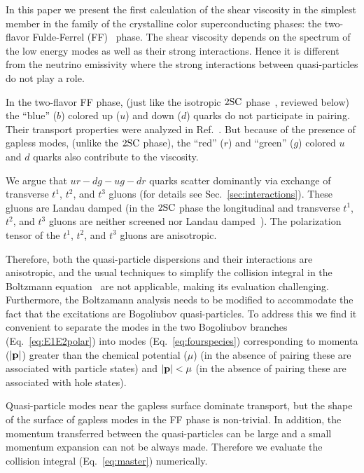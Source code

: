\documentclass[10pt, aps, prd, superscriptaddress, nofootinbib, 
               amsmath, amssymb, twocolumn,
               preprintnumbers, showpacs,
               raggedbottom,
               floatfix]{revtex4-1}
\newcommand{\bfp}{{\bf{p}}}
\newcommand{\SC}{{\rm{SC}}}
\begin{document}
In this paper we present the first calculation of the shear viscosity in the
simplest member in the family of the crystalline color superconducting phases:
the two-flavor Fulde-Ferrel (FF)~\cite{fulde1964superconductivity} phase. The
shear viscosity depends on the spectrum of the low energy modes as well
as their strong interactions. Hence it is different from the neutrino
emissivity where the strong interactions between quasi-particles do not play 
a role.  

In the two-flavor FF phase, (just like the isotropic $2\SC$
phase~\cite{Alford:1997zt,Rapp:1997zu}, reviewed
below) the ``blue'' ($b$) colored up ($u$) and down ($d$) quarks do not
participate in pairing. Their transport properties were analyzed in
Ref.~\cite{Alford:2014doa}. But because of the presence of gapless modes,
(unlike the $2\SC$ phase), the ``red'' ($r$) and ``green'' ($g$) colored $u$
and $d$ quarks also contribute to the viscosity.

We argue that $ur-dg-ug-dr$ quarks scatter dominantly via exchange of
transverse $t^1$, $t^2$, and $t^3$ gluons (for details see
Sec.~\ref{sec:interactions}). These gluons are Landau damped (in the $2\SC$
phase the longitudinal and transverse $t^1$, $t^2$, and $t^3$ gluons are 
neither screened nor Landau damped~\cite{Alford:1999pb,Rischke:2000qz,
Rischke:2000cn,Rischke:2002rz}). The polarization tensor of the $t^1$, $t^2$,
and $t^3$ gluons are anisotropic.

Therefore, both the quasi-particle dispersions and their interactions are
anisotropic, and the usual techniques to simplify the collision integral in the
Boltzmann equation~\cite{Heiselberg:1993} are not applicable, making its
evaluation challenging. Furthermore, the Boltzamann analysis needs to be
modified to accommodate the fact that the excitations are Bogoliubov
quasi-particles. To address this we find it convenient to separate the
modes in the two Bogoliubov branches (Eq.~\ref{eq:E1E2polar}) into modes
(Eq.~\ref{eq:fourspecies}) corresponding to momenta ($|\bfp|$) greater than the chemical
potential ($\mu$) (in the absence of pairing these are associated
with particle states) and $|\bfp|<\mu$ (in the absence of pairing these are
associated with hole states). 

Quasi-particle modes near the gapless surface dominate transport, but the shape of the surface
of gapless modes in the FF phase is non-trivial. In addition, the momentum
transferred between the quasi-particles can be large and a small momentum
expansion can not be always made. Therefore we evaluate the collision integral
(Eq.~\ref{eq:master}) numerically. 
 
\end{document}
